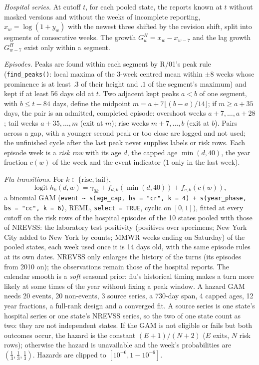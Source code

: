 \documentclass[11pt,a4paper]{article}
\theoremstyle{definition}
\theoremstyle{remark}
\begin{document}
\emph{Hospital series.} At cutoff $t$, for each pooled state, the reports
known at $t$ without masked versions and without the weeks of incomplete
reporting, $x_w=\log(1+y_w)$ with the newest three shifted by the revision
shift, split into segments of consecutive weeks. The growth
$G^H_w=x_w-x_{w-7}$ and the lag growth $G^H_{w-7}$ exist only within a
segment.

\emph{Episodes.} Peaks are found within each segment by R/01's peak rule
(\texttt{find\_peaks()}: local maxima of the 3-week centred mean within
$\pm8$ weeks whose prominence is at least $.3$ of their height and $.1$ of the
segment's maximum) and kept if at least 56 days old at $t$. Two adjacent
kept peaks $a<b$ of one segment, with $b\le t-84$ days, define the midpoint
$m=a+7\lfloor(b-a)/14\rfloor$; if $m\ge a+35$ days, the pair is an
admitted, completed episode: overshoot weeks $a+7,\dots,a+28$; tail weeks
$a+35,\dots,m$ (exit at $m$); rise weeks $m+7,\dots,b$ (exit at $b$). Pairs
across a gap, with a younger second peak or too close are logged and not
used; the unfinished cycle after the last peak never supplies labels or
risk rows. Each episode week is a \emph{risk row} with its age $d$, the
capped age $\min(d,40)$, the year fraction $c(w)$ of the week and the event
indicator ($1$ only in the last week).

\emph{Flu transitions.} For $k\in\{\mathrm{rise},\mathrm{tail}\}$,
\[
 \operatorname{logit}h_k(d,w)=\gamma_{0k}+f_{d,k}(\min(d,40))+f_{c,k}(c(w)),
\]
a binomial GAM (\texttt{event \textasciitilde{} s(age\_cap, bs = "cr", k = 4)
+ s(year\_phase, bs = "cc", k = 6)}, REML, \texttt{select = TRUE}, cyclic
on $[0,1]$), fitted at every cutoff on the risk rows of the hospital
episodes of the 10 states pooled with those of NREVSS: the laboratory test
positivity (positives over specimens; New York City added to New York by
counts; MMWR weeks ending on Saturday) of the pooled states, each week used
once it is 14 days old, with the same episode rules at its own dates.
NREVSS only enlarges the history of the turns (its episodes from 2010 on);
the observations remain those of the hospital reports. The calendar smooth
is a \emph{soft} seasonal prior: flu's historical timing makes a turn more
likely at some times of the year without fixing a peak window. A hazard GAM
needs 20 events, 20 non-events, 3 source series, a 730-day span, 4 capped
ages, 12 year fractions, a full-rank design and a converged fit. A source
series is one state's hospital series or one state's NREVSS series, so
the two of one state count as two: they are not independent states. If the
GAM is not eligible or fails but both outcomes occur, the hazard is the
constant $(E+1)/(N+2)$ ($E$ exits, $N$ risk rows); otherwise the hazard is
unavailable and the week's probabilities are $(\frac13,\frac13,\frac13)$.
Hazards are clipped to $[10^{-6},1-10^{-6}]$.
\end{document}
